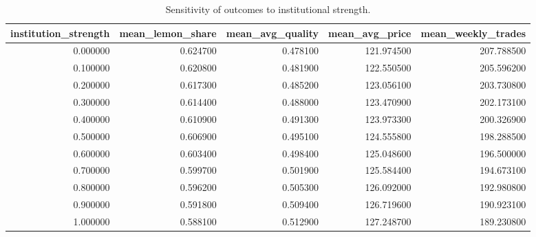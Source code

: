 \begin{table}
\caption{Sensitivity of outcomes to institutional strength.}
\label{tab:institution_sensitivity}
\begin{tabular}{rrrrr}
\toprule
institution\_strength & mean\_lemon\_share & mean\_avg\_quality & mean\_avg\_price & mean\_weekly\_trades \\
\midrule
0.000000 & 0.624700 & 0.478100 & 121.974500 & 207.788500 \\
0.100000 & 0.620800 & 0.481900 & 122.550500 & 205.596200 \\
0.200000 & 0.617300 & 0.485200 & 123.056100 & 203.730800 \\
0.300000 & 0.614400 & 0.488000 & 123.470900 & 202.173100 \\
0.400000 & 0.610900 & 0.491300 & 123.973300 & 200.326900 \\
0.500000 & 0.606900 & 0.495100 & 124.555800 & 198.288500 \\
0.600000 & 0.603400 & 0.498400 & 125.048600 & 196.500000 \\
0.700000 & 0.599700 & 0.501900 & 125.584400 & 194.673100 \\
0.800000 & 0.596200 & 0.505300 & 126.092000 & 192.980800 \\
0.900000 & 0.591800 & 0.509400 & 126.719600 & 190.923100 \\
1.000000 & 0.588100 & 0.512900 & 127.248700 & 189.230800 \\
\bottomrule
\end{tabular}
\end{table}
